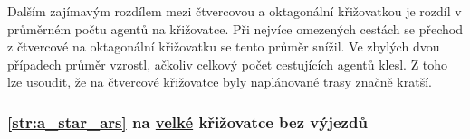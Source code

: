 Dalším zajímavým rozdílem mezi čtvercovou a oktagonální křižovatkou je rozdíl v průměrném počtu agentů na křižovatce.
Při nejvíce omezených cestách se přechod z čtvercové na oktagonální křižovatku se tento průměr snížil.
Ve zbylých dvou případech průměr vzrostl, ačkoliv celkový počet cestujících agentů klesl.
Z toho lze usoudit, že na čtvercové křižovatce byly naplánované trasy značně kratší.

\subsubsection{\ref{str:a_star_ars} na \hyperref[par:data_velka]{velké} křižovatce bez výjezdů}
\label{subsubsec:exp_ars_velka_krizovatka_bez_vyjezdu}












